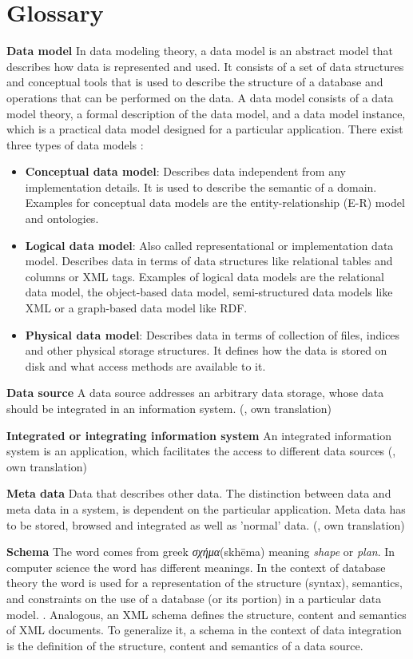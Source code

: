 \chapter{Glossary}

\textbf{Data model} In data modeling theory, a data model is an abstract model that describes how data is represented and used. It consists of a set of data structures and conceptual tools that is used to describe the structure of a database and operations that can be performed on the data. A data model consists of a data model theory, a formal description of the data model, and a data model instance, which is a practical data model designed for a particular application. There exist three types of data models \cite[p.10-14]{IntroductionToDatabaseSystems2010}:
\begin{itemize}
	\item \textbf{Conceptual data model}: Describes data independent from any implementation details. It is used to describe the semantic of a domain. Examples for conceptual data models are the entity-relationship (E-R) model and ontologies. 
	\item \textbf{Logical data model}: Also called representational or implementation data model. Describes data in terms of data structures like relational tables and columns or XML tags. Examples of logical data models are the relational data model, the object-based data model, semi-structured data models like XML or a graph-based data model like RDF. 
	\item \textbf{Physical data model}: Describes data in terms of collection of files, indices and other physical storage structures. It defines how the data is stored on disk and what access methods are available to it. 
\end{itemize}

\textbf{Data source} A data source addresses an arbitrary data storage, whose data should be integrated in an information system. (\cite[p. 7]{DBLP:books/dp/LeserN2006}, own translation)

\textbf{Integrated or integrating information system} An integrated information system is an application, which facilitates the access to different data sources (\cite[p. 7]{DBLP:books/dp/LeserN2006}, own translation)

\textbf{Meta data} Data that describes other data. The distinction between data and meta data in a system, is dependent on the particular application. Meta data has to be stored, browsed and integrated as well as 'normal' data. (\cite[p. 8]{DBLP:books/dp/LeserN2006}, own translation)

\textbf{Schema} The word comes from greek \foreignlanguage{greek}{\emph{σχήμα}}(skhēma) meaning \emph{shape} or \emph{plan}. In computer science the word has different meanings. 
In the context of database theory the word is used for a representation of the structure (syntax), semantics, and constraints on the use of a database (or its portion) in a particular data model. \cite[p. 235]{Sheth:1990:FDS:96602.96604}. Analogous, an XML schema defines the structure, content and semantics of XML documents\cite{w3XMLSchema}. To generalize it, a schema in the context of data integration is the definition of the structure, content and semantics of a data source.


